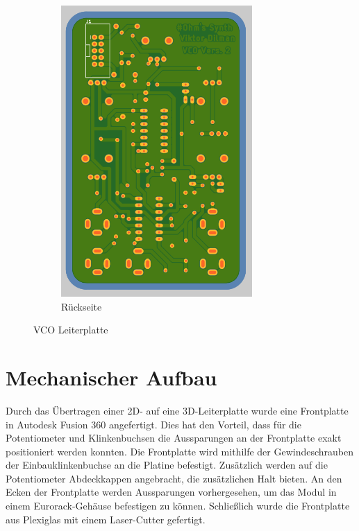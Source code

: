 \begin{figure}[h]
\begin{subfigure}{.5\textwidth}
		\includegraphics[width=0.8\textwidth]{figures/VCO_Rendering_Back}
		\caption{Rückseite}
		\label{fig:VCO_Back}
	\end{subfigure}
	\caption{VCO Leiterplatte}
	\label{fig:VCO Leiterplatte}
\end{figure}


\newpage
\section{Mechanischer Aufbau}
Durch das Übertragen einer 2D- auf eine 3D-Leiterplatte wurde eine Frontplatte in Autodesk Fusion 360 angefertigt.
Dies hat den Vorteil, dass für die Potentiometer und Klinkenbuchsen die Aussparungen an der Frontplatte exakt positioniert werden konnten.
Die Frontplatte wird mithilfe der Gewindeschrauben der Einbauklinkenbuchse an die Platine befestigt.
Zusätzlich werden auf die Potentiometer Abdeckkappen angebracht, die zusätzlichen Halt bieten.
An den Ecken der Frontplatte werden Aussparungen vorhergesehen, um das Modul in einem Eurorack-Gehäuse befestigen zu können.
Schließlich wurde die Frontplatte aus Plexiglas mit einem Laser-Cutter gefertigt.

